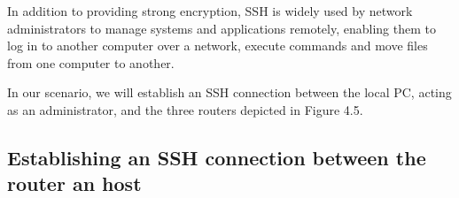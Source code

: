 In addition to providing strong encryption, SSH is widely used by network administrators to manage systems and applications remotely, enabling them to log in to another computer over a network, execute commands and move files from one computer to another.

In our scenario, we will establish an SSH connection between the local PC, acting as an administrator, and the three routers depicted in Figure 4.5.

\subsection{Establishing an SSH connection between the router an host}